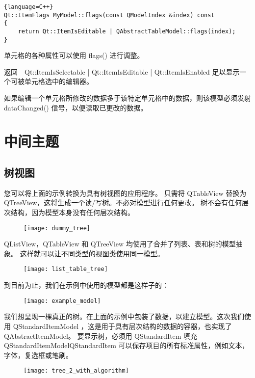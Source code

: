 \begin{lstlisting}{language=C++}
Qt::ItemFlags MyModel::flags(const QModelIndex &index) const
{
    return Qt::ItemIsEditable | QAbstractTableModel::flags(index);
}
\end{lstlisting}

单元格的各种属性可以使用 flags() 进行调整。

返回　Qt::ItemIsSelectable | Qt::ItemIsEditable | Qt::ItemIsEnabled 足以显示一个可被单元格选中的编辑器。

如果编辑一个单元格所修改的数据多于该特定单元格中的数据，则该模型必须发射　dataChanged() 信号，以便读取已更改的数据。

\section{中间主题}

\subsection{树视图}

您可以将上面的示例转换为具有树视图的应用程序。
只需将 QTableView 替换为 QTreeView，这将生成一个读/写树。不必对模型进行任何更改。
树不会有任何层次结构，因为模型本身没有任何层次结构。

\begin{figure}[hbt!]  
\texttt{[image: dummy\_tree]}
\end{figure}


QListView，QTableView 和 QTreeView 均使用了合并了列表、表和树的模型抽象。
这样就可以让不同类型的视图类使用同一模型。

\begin{figure}[hbt!]  
\texttt{[image: list\_table\_tree]}
\end{figure}

到目前为止，我们在示例中使用的模型都是这样子的：

\begin{figure}[hbt!]  
\texttt{[image: example\_model]}
\end{figure}

我们想呈现一棵真正的树。在上面的示例中包装了数据，以建立模型。这次我们使用 QStandardItemModel ，这是用于具有层次结构的数据的容器，也实现了 QAbstractItemModel。
要显示树，必须用 QStandardItem 填充 QStandardItemModelQStandardItem 可以保存项目的所有标准属性，例如文本，字体，复选框或笔刷。

\begin{figure}[hbt!]  
\texttt{[image: tree\_2\_with\_algorithm]}
\end{figure}

